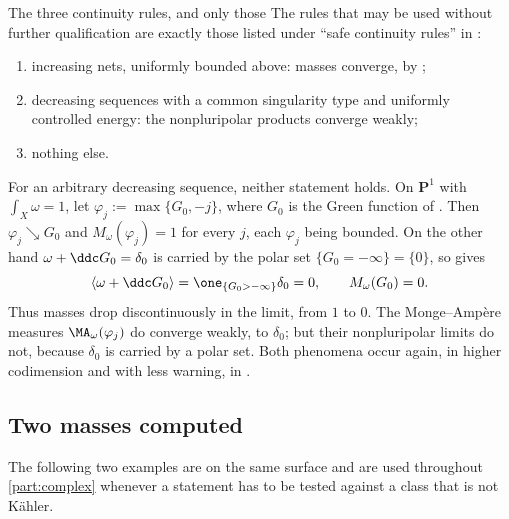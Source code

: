 \begin{warning}{The three continuity rules, and only those}
\label{warn:ch51-continuity-rules}
The rules that may be used without further qualification are exactly
those listed under ``safe continuity rules'' in :
\begin{enumerate}
\item increasing nets, uniformly bounded above: masses converge, by
      ;
\item decreasing sequences with a common singularity type and uniformly
      controlled energy: the nonpluripolar products converge weakly;
\item nothing else.
\end{enumerate}
For an arbitrary decreasing sequence, neither statement holds.  On
\(\mathbf P^1\) with \(\int_X\omega=1\), let
\(\varphi_j:=\max\{G_0,-j\}\), where \(G_0\) is the Green function of
.  Then \(\varphi_j\searrow G_0\) and
\(M_\omega(\varphi_j)=1\) for every \(j\), each \(\varphi_j\) being
bounded.  On the other hand \(\omega+\ddc G_0=\delta_0\) is carried by
the polar set \(\{G_0=-\infty\}=\{0\}\), so
 gives
\[
 \langle\omega+\ddc G_0\rangle
 =\one_{\{G_0>-\infty\}}\delta_0=0,
 \qquad
 M_\omega(G_0)=0 .
\]
Thus masses drop discontinuously in the limit, from \(1\) to \(0\).  The Monge--Amp\`ere measures
\(\MA_\omega(\varphi_j)\) do converge weakly, to \(\delta_0\); but their
nonpluripolar limits do not, because \(\delta_0\) is carried by a polar
set.  Both phenomena occur again, in higher codimension and with less
warning, in .
\end{warning}

\subsection{Two masses computed}
\label{sec:ch51-masses-computed}

The following two examples are on the same surface and are used
throughout \cref{part:complex} whenever a statement has to be tested
against a class that is not K\"ahler.

